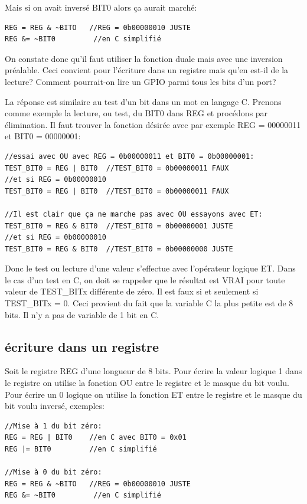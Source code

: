 Mais si on avait inversé BIT0 alors ça aurait marché:

\lstset{style=customc}
\begin{lstlisting}
REG = REG & ~BITO   //REG = 0b00000010 JUSTE 
REG &= ~BIT0         //en C simplifié
\end{lstlisting}

On constate donc qu'il faut utiliser la fonction duale mais avec une inversion préalable. Ceci convient pour l'écriture dans un registre mais qu'en est-il de la lecture? Comment pourrait-on lire un GPIO parmi tous les bits d'un port?

La réponse est similaire au test d'un bit dans un mot en langage C. Prenons comme exemple la lecture, ou test, du BIT0 dans REG et procédons par élimination. Il faut trouver la fonction désirée avec par exemple REG = 00000011 et BIT0 = 00000001:

\lstset{style=customc}
\begin{lstlisting}
//essai avec OU avec REG = 0b00000011 et BIT0 = 0b00000001:
TEST_BIT0 = REG | BIT0  //TEST_BIT0 = 0b00000011 FAUX
//et si REG = 0b00000010
TEST_BIT0 = REG | BIT0  //TEST_BIT0 = 0b00000011 FAUX

//Il est clair que ça ne marche pas avec OU essayons avec ET:
TEST_BIT0 = REG & BIT0  //TEST_BIT0 = 0b00000001 JUSTE
//et si REG = 0b00000010
TEST_BIT0 = REG & BIT0  //TEST_BIT0 = 0b00000000 JUSTE
\end{lstlisting}

Donc le test ou lecture d'une valeur s'effectue avec l'opérateur logique ET. Dans le cas d'un test en C, on doit se rappeler que le résultat est VRAI pour toute valeur de TEST\_BITx différente de zéro. Il est faux si et seulement si TEST\_BITx = 0. Ceci provient du fait que la variable C la plus petite est de 8 bits. Il n'y a pas de variable de 1 bit en C. 

\subsection{écriture dans un registre}

Soit le registre REG d'une longueur de 8 bits. Pour écrire la valeur logique 1 dans le registre on utilise la fonction OU entre le registre et le masque du bit voulu. Pour écrire un 0 logique on utilise la fonction ET entre le registre et le masque du bit voulu inversé, exemples:

\lstset{style=customc}
\begin{lstlisting}
//Mise à 1 du bit zéro:
REG = REG | BIT0    //en C avec BIT0 = 0x01
REG |= BIT0		    //en C simplifié

//Mise à 0 du bit zéro:
REG = REG & ~BITO   //REG = 0b00000010 JUSTE 
REG &= ~BIT0         //en C simplifié
\end{lstlisting}

